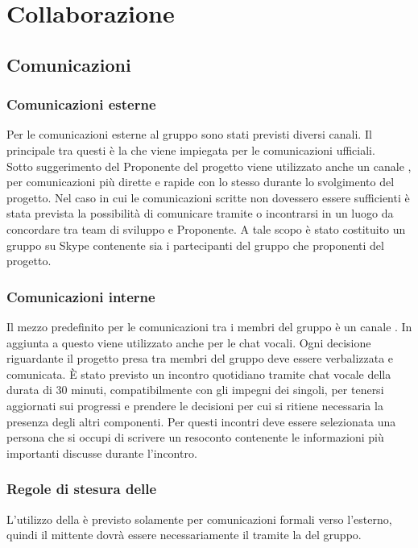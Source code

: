 \section{Collaborazione}
\subsection{Comunicazioni}
\subsubsection{Comunicazioni esterne}
Per le comunicazioni esterne al gruppo sono stati previsti diversi canali.
Il principale tra questi è la \email{} \href{mailto:\GroupEmail}{\GroupEmail}{} che viene impiegata per le comunicazioni ufficiali.\\
Sotto suggerimento del Proponente del progetto viene utilizzato anche un canale , per comunicazioni più dirette e rapide con lo stesso durante lo svolgimento del progetto. Nel caso in cui le comunicazioni scritte non dovessero essere sufficienti è stata prevista la possibilità di comunicare tramite  o incontrarsi in un luogo da concordare tra team di sviluppo e Proponente. A tale scopo è stato costituito un gruppo su Skype contenente sia i partecipanti del gruppo che proponenti del progetto.

\subsubsection{Comunicazioni interne} \label{sec:comunicazioni_interne}
Il mezzo predefinito per le comunicazioni tra i membri del gruppo è un canale .
In aggiunta a questo viene utilizzato anche  per le chat vocali.
Ogni decisione riguardante il progetto presa tra membri del gruppo deve essere verbalizzata e comunicata.
\`{E} stato previsto un incontro quotidiano tramite chat vocale della durata di 30 minuti, compatibilmente con gli impegni dei singoli, per tenersi aggiornati sui progressi e prendere le decisioni per cui si ritiene necessaria la presenza degli altri componenti. Per questi incontri deve essere selezionata una persona che si occupi di scrivere un resoconto contenente le informazioni più importanti discusse durante l'incontro.

\subsubsection{Regole di stesura delle \email}
L'utilizzo della \email{} è previsto solamente per comunicazioni formali verso l'esterno, quindi il mittente dovrà essere necessariamente il \Responsabile tramite la \email{} del gruppo.

